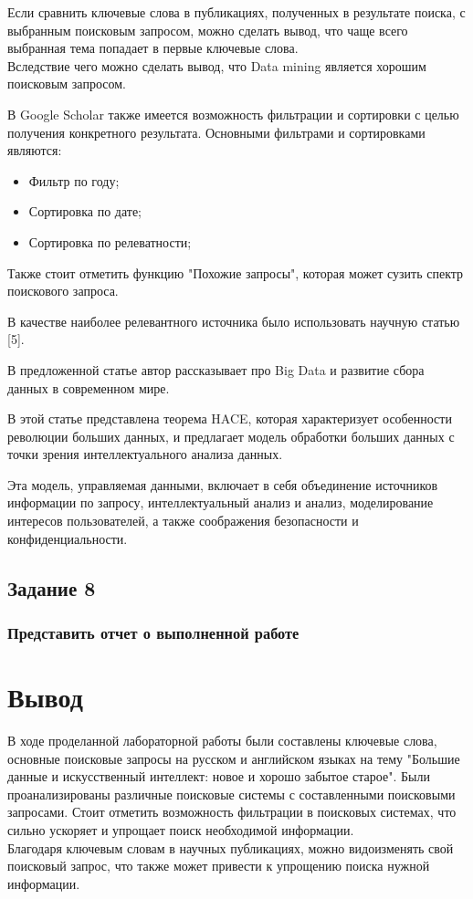 \documentclass[14pt,a4paper,report]{report}
\begin{document}
Если сравнить ключевые слова в публикациях, полученных в результате поиска, с выбранным поисковым запросом, можно сделать вывод, что чаще всего выбранная тема попадает в первые ключевые слова.\\
Вследствие чего можно сделать вывод, что Data mining является хорошим поисковым запросом.

В Google Scholar также имеется возможность фильтрации и сортировки с целью получения конкретного результата.
Основными фильтрами и сортировками являются:
\begin{itemize}
	\item Фильтр по году;
	\item Сортировка по дате;
	\item Сортировка по релеватности;
\end{itemize}

Также стоит отметить функцию "Похожие запросы", которая может сузить спектр поискового запроса.

В качестве наиболее релевантного источника было использовать научную статью [5].

В предложенной статье автор рассказывает про Big Data и развитие сбора данных в современном мире.

В этой статье представлена теорема HACE, которая характеризует особенности революции больших данных, и предлагает модель обработки больших данных с точки зрения интеллектуального анализа данных.

Эта модель, управляемая данными, включает в себя объединение источников информации по запросу, интеллектуальный анализ и анализ, моделирование интересов пользователей, а также соображения безопасности и конфиденциальности.


\subsection{Задание 8}

\subsubsection{Представить отчет о выполненной работе}


\section{Вывод}
В ходе проделанной лабораторной работы были составлены ключевые слова, основные поисковые запросы на русском и английском языках на тему "Большие данные и искусственный интеллект: новое и хорошо забытое старое". Были проанализированы различные поисковые системы с составленными поисковыми запросами. Стоит отметить возможность фильтрации в поисковых системах, что сильно ускоряет и упрощает поиск необходимой информации.\\
Благодаря ключевым словам в научных публикациях, можно видоизменять свой поисковый запрос, что также может привести к упрощению поиска нужной информации.
\end{document}
